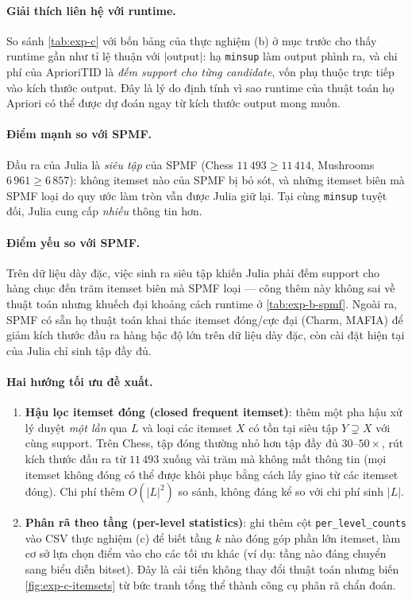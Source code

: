 \paragraph{Giải thích liên hệ với runtime.} So sánh \autoref{tab:exp-c} với bốn bảng của thực nghiệm (b) ở mục trước cho thấy runtime gần như tỉ lệ thuận với $|\text{output}|$: hạ \texttt{minsup} làm output phình ra, và chi phí của AprioriTID là \emph{đếm support cho từng candidate}, vốn phụ thuộc trực tiếp vào kích thước output. Đây là lý do định tính vì sao runtime của thuật toán họ Apriori có thể được dự đoán ngay từ kích thước output mong muốn.

\paragraph{Điểm mạnh so với SPMF.} Đầu ra của Julia là \emph{siêu tập} của SPMF (Chess $11\,493 \geq 11\,414$, Mushrooms $6\,961 \geq 6\,857$): không itemset nào của SPMF bị bỏ sót, và những itemset biên mà SPMF loại do quy ước làm tròn vẫn được Julia giữ lại. Tại cùng \texttt{minsup} tuyệt đối, Julia cung cấp \emph{nhiều} thông tin hơn.

\paragraph{Điểm yếu so với SPMF.} Trên dữ liệu dày đặc, việc sinh ra siêu tập khiến Julia phải đếm support cho hàng chục đến trăm itemset biên mà SPMF loại --- công thêm này không sai về thuật toán nhưng khuếch đại khoảng cách runtime ở \autoref{tab:exp-b-spmf}. Ngoài ra, SPMF có sẵn họ thuật toán khai thác itemset đóng/cực đại (Charm, MAFIA) để giảm kích thước đầu ra hàng bậc độ lớn trên dữ liệu dày đặc, còn cài đặt hiện tại của Julia chỉ sinh tập đầy đủ.

\paragraph{Hai hướng tối ưu đề xuất.}
\begin{enumerate}
    \item \textbf{Hậu lọc itemset đóng (closed frequent itemset)}: thêm một pha hậu xử lý  duyệt \emph{một lần} qua $L$ và loại các itemset $X$ có tồn tại siêu tập $Y \supsetneq X$ với cùng support. Trên Chess, tập đóng thường nhỏ hơn tập đầy đủ $30$--$50\times$, rút kích thước đầu ra từ $11\,493$ xuống vài trăm mà không mất thông tin (mọi itemset không đóng có thể được khôi phục bằng cách lấy giao từ các itemset đóng). Chi phí thêm $O(|L|^2)$ so sánh, không đáng kể so với chi phí sinh $|L|$.
    \item \textbf{Phân rã theo tầng (per-level statistics)}: ghi thêm cột \texttt{per\_level\_counts} vào CSV thực nghiệm (c) để biết tầng $k$ nào đóng góp phần lớn itemset, làm cơ sở lựa chọn điểm vào cho các tối ưu khác (ví dụ: tầng nào đáng chuyển sang biểu diễn bitset). Đây là cải tiến không thay đổi thuật toán nhưng biến \autoref{fig:exp-c-itemsets} từ bức tranh tổng thể thành công cụ phân rã chẩn đoán.
\end{enumerate}

